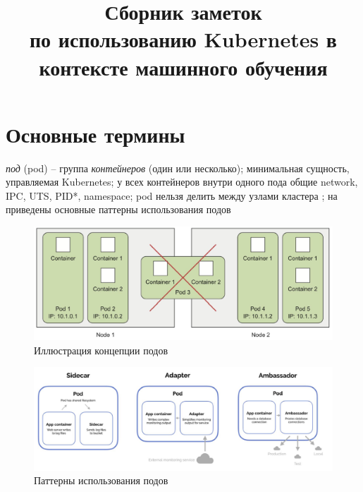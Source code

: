 \documentclass[%
	11pt,
	a4paper,
	utf8,
		]{article}
\begin{document}
\title{Сборник заметок\\по использованию Kubernetes в контексте машинного обучения}

\author{}

\date{}
\maketitle

\thispagestyle{fancy}

\tableofcontents


\section{Основные термины}

\noindent\emph{под} (pod) -- группа \emph{контейнеров} (один или несколько); минимальная сущность, управляемая Kubernetes; у всех контейнеров внутри одного пода общие network, IPC, UTS, PID*, namespace; pod нельзя делить между узлами кластера ; на  приведены основные паттерны использования подов

\begin{figure}[h]
	\centering
	\includegraphics[scale=0.55]{figures/pod.png}
	\caption{ Иллюстрация концепции подов }\label{fig:pod}
\end{figure}

\begin{figure}[h]
	\centering
	\includegraphics[scale=0.55]{figures/podpatterns.png}
	\caption{ Паттерны использования подов }\label{fig:podpatterns}
\end{figure}
\end{document}
